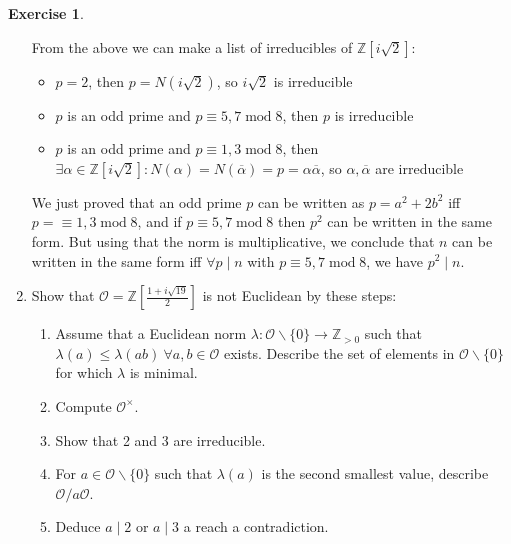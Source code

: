 \documentclass{article}
\newcommand{\Z}{\mathbb{Z}}
\newcommand{\Mod}{\operatorname{mod}}
\newcommand{\ri}{\mathcal{O}}
\theoremstyle{definition}
\newtheorem{exe}[defn]{Exercise}
\begin{document}
\begin{exe}
\begin{enumerate}
From the above we can make a list of irreducibles of $\Z\left[i\sqrt 2\right]$:
\begin{itemize}
\item $p=2$, then $p=N(i\sqrt 2)$, so $i\sqrt 2$ is irreducible
\item $p$ is an odd prime and $p\equiv 5,7\Mod 8$, then $p$ is irreducible
\item $p$ is an odd prime and $p\equiv 1,3\Mod 8$, then $\exists\alpha\in\Z\left[i\sqrt 2\right]:N(\alpha)=N(\overline\alpha)=p=\alpha\overline\alpha$, so $\alpha,\overline\alpha$ are irreducible
\end{itemize}
We just proved that an odd prime $p$ can be written as $p=a^2+2b^2$ iff $p=\equiv 1,3\Mod 8$, and if $p\equiv 5,7\Mod 8$ then $p^2$ can be written in the same form. But using that the norm is multiplicative, we conclude that $n$ can be written in the same form iff $\forall p\mid n$ with $p\equiv 5,7\Mod 8$, we have $p^2\mid n$.
\item Show that $\ri=\Z\left[\frac{1+i\sqrt{19}}{2}\right]$ is not Euclidean by these steps:
\begin{enumerate}
\item Assume that a Euclidean norm $\lambda:\ri\backslash\{0\}\rightarrow\Z_{>0}$ such that $\lambda(a)\leq\lambda(ab) \ \forall a,b\in\ri$ exists. Describe the set of elements in $\ri\backslash\{0\}$ for which $\lambda$ is minimal.
\item Compute $\ri^\times$.
\item Show that 2 and 3 are irreducible.
\item For $a\in\ri\backslash\{0\}$ such that $\lambda(a)$ is the second smallest value, describe $\ri/a\ri$.
\item Deduce $a\mid 2$ or $a\mid 3$ a reach a contradiction.
\end{enumerate}


\end{enumerate}
\end{exe}
\end{document}
